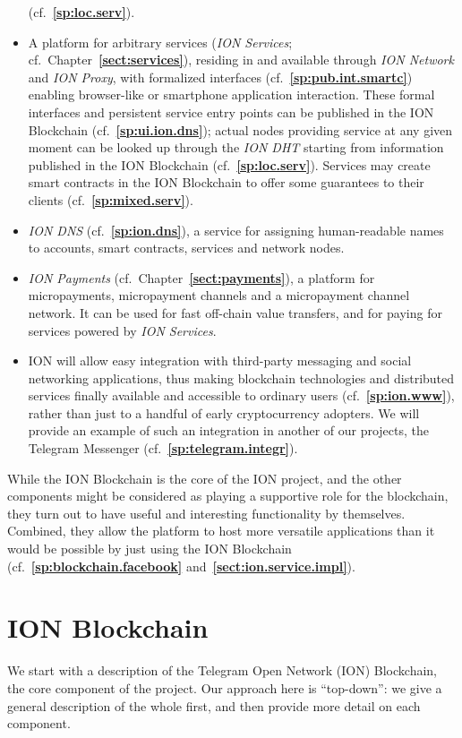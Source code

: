 \documentclass[12pt,oneside]{article}
\def\refpoint#1{{\rm\textbf{\ref{#1}}}}
\let\ptref=\refpoint
\def\mysection#1{\section{#1}\fancyhead[C]{\textsc{Chapter \textbf{\thesection.} #1}}}
\begin{document}
\begin{itemize}
  (cf.~\ptref{sp:loc.serv}).
\item A platform for arbitrary services ({\em ION Services};
  cf.\ Chapter~\ptref{sect:services}), residing in and available
  through {\em ION Network\/} and {\em ION Proxy}, with formalized
  interfaces (cf.~\ptref{sp:pub.int.smartc}) enabling browser-like or
  smartphone application interaction. These formal interfaces and
  persistent service entry points can be published in the ION
  Blockchain (cf.~\ptref{sp:ui.ion.dns}); actual nodes providing
  service at any given moment can be looked up through the {\em ION
    DHT\/} starting from information published in the ION Blockchain
  (cf.~\ptref{sp:loc.serv}). Services may create smart contracts in
  the ION Blockchain to offer some guarantees to their clients
  (cf.~\ptref{sp:mixed.serv}).
\item {\em ION DNS\/} (cf.~\ptref{sp:ion.dns}), a service for
  assigning human-readable names to accounts, smart contracts,
  services and network nodes.
\item {\em ION Payments\/} (cf.\ Chapter~\ptref{sect:payments}), a
  platform for micropayments, micropayment channels and a micropayment
  channel network. It can be used for fast off-chain value transfers,
  and for paying for services powered by {\em ION Services}.
\item ION will allow easy integration with third-party messaging and
  social networking applications, thus making blockchain technologies
  and distributed services finally available and accessible to
  ordinary users (cf.~\ptref{sp:ion.www}), rather than just to a
  handful of early cryptocurrency adopters. We will provide an example
  of such an integration in another of our projects, the Telegram
  Messenger (cf.~\ptref{sp:telegram.integr}).
\end{itemize}

While the ION Blockchain is the core of the ION project, and the other
components might be considered as playing a supportive role for the
blockchain, they turn out to have useful and interesting functionality
by themselves. Combined, they allow the platform to host more
versatile applications than it would be possible by just using the ION
Blockchain (cf.~\ptref{sp:blockchain.facebook}
and~\ptref{sect:ion.service.impl}).

\clearpage
\mysection{ION Blockchain}\label{sect:blockchain}

We start with a description of the Telegram Open Network (ION)
Blockchain, the core component of the project. Our approach here is
``top-down'': we give a general description of the whole first, and
then provide more detail on each component.
\end{document}
